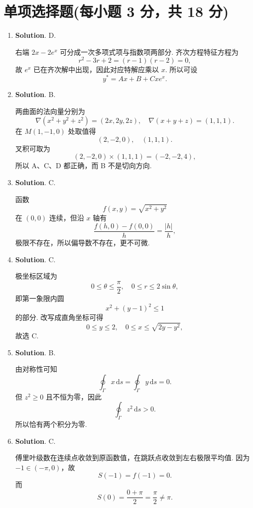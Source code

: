 \documentclass[../Main.tex]{subfiles}
\begin{document}
\section{单项选择题(每小题 3 分，共 18 分)}
\begin{enumerate}
    \item \textbf{Solution}. D.

          右端 \(2x-2e^x\) 可分成一次多项式项与指数项两部分. 齐次方程特征方程为
          \[
              r^2-3r+2=(r-1)(r-2)=0,
          \]
          故 \(e^x\) 已在齐次解中出现，因此对应特解应乘以 \(x\). 所以可设
          \[
              y^*=Ax+B+Cxe^x.
          \]

    \item \textbf{Solution}. B.

          两曲面的法向量分别为
          \[
              \nabla(x^2+y^2+z^2)=(2x,2y,2z),\quad \nabla(x+y+z)=(1,1,1).
          \]
          在 \(M(1,-1,0)\) 处取值得
          \[
              (2,-2,0),\quad (1,1,1).
          \]
          叉积可取为
          \[
              (2,-2,0)\times(1,1,1)=(-2,-2,4),
          \]
          所以 A、C、D 都正确，而 B 不是切向方向.

    \item \textbf{Solution}. C.

          函数
          \[
              f(x,y)=\sqrt{x^2+y^2}
          \]
          在 \((0,0)\) 连续，但沿 \(x\) 轴有
          \[
              \frac{f(h,0)-f(0,0)}{h}=\frac{|h|}{h},
          \]
          极限不存在，所以偏导数不存在，更不可微.

    \item \textbf{Solution}. C.

          极坐标区域为
          \[
              0\le \theta\le \frac{\pi}{2},\quad 0\le r\le 2\sin\theta,
          \]
          即第一象限内圆
          \[
              x^2+(y-1)^2\le 1
          \]
          的部分. 改写成直角坐标可得
          \[
              0\le y\le 2,\quad 0\le x\le \sqrt{2y-y^2},
          \]
          故选 C.

    \item \textbf{Solution}. B.

          由对称性可知
          \[
              \oint_\Gamma x\,\mathrm{d}s=\oint_\Gamma y\,\mathrm{d}s=0.
          \]
          但 \(z^2\ge 0\) 且不恒为零，因此
          \[
              \oint_\Gamma z^2\,\mathrm{d}s>0.
          \]
          所以恰有两个积分为零.

    \item \textbf{Solution}. C.

          傅里叶级数在连续点收敛到原函数值，在跳跃点收敛到左右极限平均值. 因为 \(-1\in(-\pi,0)\)，故
          \[
              S(-1)=f(-1)=0.
          \]
          而
          \[
              S(0)=\frac{0+\pi}{2}=\frac{\pi}{2}\neq \pi.
          \]
\end{enumerate}
\end{document}
